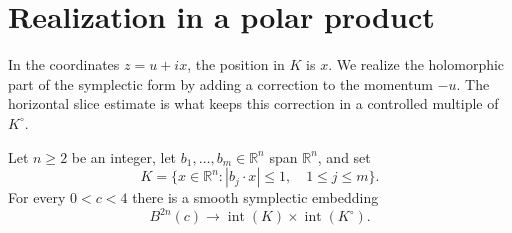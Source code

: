 \section{Realization in a polar product}
\label{sec:realization}

In the coordinates $z=u+ix$, the position in $K$ is $x$. We realize the holomorphic part of the symplectic form by adding a correction to the momentum $-u$. The horizontal slice estimate is what keeps this correction in a controlled multiple of $K^\circ$.

\begin{proposition}\label{prop:finite-strips}
Let $n\ge2$ be an integer, let $b_1,\ldots,b_m\in\mathbb{R}^n$ span $\mathbb{R}^n$, and set
\[
 K=\{x\in\mathbb{R}^n: |b_j\cdot x|\le 1,
                         \quad 1\le j\le m\}.
\]
For every $0<c<4$ there is a smooth symplectic embedding
\[
 B^{2n}(c)\longrightarrow
 \operatorname{int}(K)\times\operatorname{int}(K^\circ).
\]
\end{proposition}

